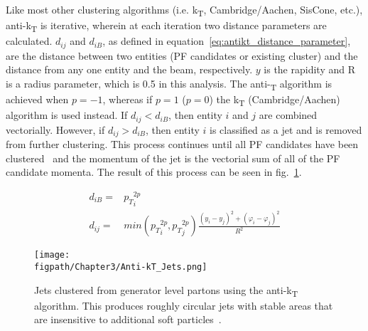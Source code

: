 Like most other clustering algorithms (i.e. k\textsubscript{T}, Cambridge/Aachen, SisCone, etc.), anti-k\textsubscript{T} is iterative, wherein at each iteration two distance parameters are calculated.
$d_{ij}$ and $d_{iB}$, as defined in equation~\ref{eq:antikt_distance_parameter}, are the distance between two entities (PF candidates or existing cluster) and the distance from any one entity and the beam, respectively.
$y$ is the rapidity and R is a radius parameter, which is 0.5 in this analysis.
The anti-\textsubscript{T} algorithm is achieved when $p=-1$, whereas if $p=1$ ($p=0$) the k\textsubscript{T} (Cambridge/Aachen) algorithm is used instead.
If $d_{ij}<d_{iB}$, then entity $i$ and $j$ are combined vectorially.
However, if $d_{ij}>d_{iB}$, then entity $i$ is classified as a jet and is removed from further clustering.
This process continues until all PF candidates have been clustered~\cite{Cacciari:2008gp} and the momentum of the jet is the vectorial sum of all of the PF candidate momenta.
The result of this process can be seen in fig.~\ref{fig:anti-kT_jets}.

\begin{subequations}
    \label{eq:antikt_distance_parameter}
    \begin{align}
\label{eq:antikt_distance_parameter_1}d_{iB}={}&{p_{T}}_{i}^{2p}\\
\label{eq:antikt_distance_parameter_2}d_{ij}={}&min\left({p_{T}}_{i}^{2p},{p_{T}}_{j}^{2p}\right)\frac{\left(y_{i}-y_{j}\right)^{2}+\left(\varphi_{i}-\varphi_{j}\right)^{2}}{R^{2}}
    \end{align}
\end{subequations}

\begin{figure}[!hbt]
    \centering
    \texttt{[image: \\figpath/Chapter3/Anti-kT\_Jets.png]}
    \caption{Jets clustered from generator level partons using the anti-k\textsubscript{T} algorithm. This produces roughly circular jets with stable areas that are insensitive to additional soft particles~\cite{Cacciari:2008gp}.}
    \label{fig:anti-kT_jets}
\end{figure}

